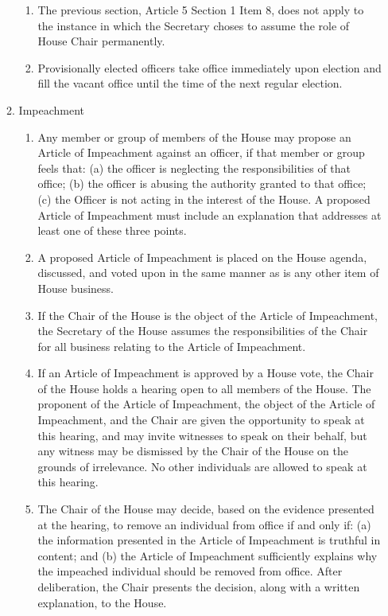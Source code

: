 \documentclass[letterpaper]{article}
\begin{document}
\begin{enumerate}
\begin{enumerate}
\begin{enumerate}
\item The previous section, Article 5 Section 1 Item 8, does not apply to the instance in which the Secretary choses to assume the role of House Chair permanently.

\item Provisionally elected officers take office immediately upon election and fill the vacant office until the time of the next regular election.

\end{enumerate}

\item Impeachment

\begin{enumerate}

\item Any member or group of members of the House may propose an Article of Impeachment against an officer, if that member or group feels that: (a) the officer is neglecting the responsibilities of that office; (b) the officer is abusing the authority granted to that office; (c) the Officer is not acting in the interest of the House. A proposed Article of Impeachment must include an explanation that addresses at least one of these three points.

\item A proposed Article of Impeachment is placed on the House agenda, discussed, and voted upon in the same manner as is any other item of House business.

\item If the Chair of the House is the object of the Article of Impeachment, the Secretary of the House assumes the responsibilities of the Chair for all business relating to the Article of Impeachment.

\item If an Article of Impeachment is approved by a House vote, the Chair of the House holds a hearing open to all members of the House. The proponent of the Article of Impeachment, the object of the Article of Impeachment, and the Chair are given the opportunity to speak at this hearing, and may invite witnesses to speak on their behalf, but any witness may be dismissed by the Chair of the House on the grounds of irrelevance. No other individuals are allowed to speak at this hearing.

\item The Chair of the House may decide, based on the evidence presented at the hearing, to remove an individual from office if and only if: (a) the information presented in the Article of Impeachment is truthful in content; and (b) the Article of Impeachment sufficiently explains why the impeached individual should be removed from office. After deliberation, the Chair presents the decision, along with a written explanation, to the House.


\end{enumerate}
\end{enumerate}
\end{enumerate}
\end{document}
